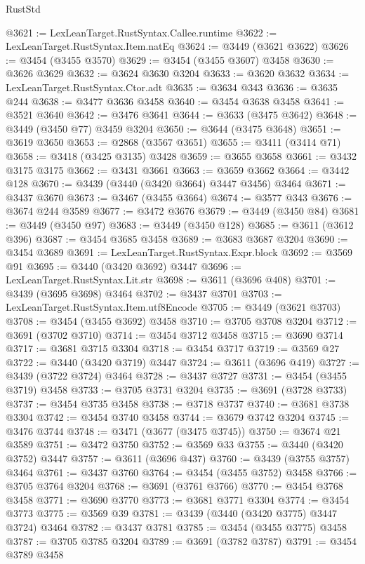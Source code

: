 \begin{lexlean}{RustStd}
\begin{coremodule}
{{{{{{{{{{{{{{{{{{{@3621 := LexLeanTarget.RustSyntax.Callee.runtime
@3622 := LexLeanTarget.RustSyntax.Item.natEq
@3624 := @3449 (@3621 @3622)
@3626 := @3454 (@3455 @3570)
@3629 := @3454 (@3455 @3607) @3458
@3630 := @3626 @3629
@3632 := @3624 @3630 @3204
@3633 := @3620 @3632
@3634 := LexLeanTarget.RustSyntax.Ctor.adt
@3635 := @3634 @343
@3636 := @3635 @244
@3638 := @3477 @3636 @3458
@3640 := @3454 @3638 @3458
@3641 := @3521 @3640
@3642 := @3476 @3641
@3644 := @3633 (@3475 @3642)
@3648 := @3449 (@3450 @77) @3459 @3204
@3650 := @3644 (@3475 @3648)
@3651 := @3619 @3650
@3653 := @2868 (@3567 @3651)
@3655 := @3411 (@3414 @71)
@3658 := @3418 (@3425 @3135) @3428
@3659 := @3655 @3658
@3661 := @3432 @3175 @3175
@3662 := @3431 @3661
@3663 := @3659 @3662
@3664 := @3442 @128
@3670 := @3439 (@3440 (@3420 @3664) @3447 @3456) @3464
@3671 := @3437 @3670
@3673 := @3467 (@3455 @3664)
@3674 := @3577 @343
@3676 := @3674 @244 @3589
@3677 := @3472 @3676
@3679 := @3449 (@3450 @84)
@3681 := @3449 (@3450 @97)
@3683 := @3449 (@3450 @128)
@3685 := @3611 (@3612 @396)
@3687 := @3454 @3685 @3458
@3689 := @3683 @3687 @3204
@3690 := @3454 @3689
@3691 := LexLeanTarget.RustSyntax.Expr.block
@3692 := @3569 @91
@3695 := @3440 (@3420 @3692) @3447
@3696 := LexLeanTarget.RustSyntax.Lit.str
@3698 := @3611 (@3696 @408)
@3701 := @3439 (@3695 @3698) @3464
@3702 := @3437 @3701
@3703 := LexLeanTarget.RustSyntax.Item.utf8Encode
@3705 := @3449 (@3621 @3703)
@3708 := @3454 (@3455 @3692) @3458
@3710 := @3705 @3708 @3204
@3712 := @3691 (@3702 @3710)
@3714 := @3454 @3712 @3458
@3715 := @3690 @3714
@3717 := @3681 @3715 @3304
@3718 := @3454 @3717
@3719 := @3569 @27
@3722 := @3440 (@3420 @3719) @3447
@3724 := @3611 (@3696 @419)
@3727 := @3439 (@3722 @3724) @3464
@3728 := @3437 @3727
@3731 := @3454 (@3455 @3719) @3458
@3733 := @3705 @3731 @3204
@3735 := @3691 (@3728 @3733)
@3737 := @3454 @3735 @3458
@3738 := @3718 @3737
@3740 := @3681 @3738 @3304
@3742 := @3454 @3740 @3458
@3744 := @3679 @3742 @3204
@3745 := @3476 @3744
@3748 := @3471 (@3677 (@3475 @3745))
@3750 := @3674 @21 @3589
@3751 := @3472 @3750
@3752 := @3569 @33
@3755 := @3440 (@3420 @3752) @3447
@3757 := @3611 (@3696 @437)
@3760 := @3439 (@3755 @3757) @3464
@3761 := @3437 @3760
@3764 := @3454 (@3455 @3752) @3458
@3766 := @3705 @3764 @3204
@3768 := @3691 (@3761 @3766)
@3770 := @3454 @3768 @3458
@3771 := @3690 @3770
@3773 := @3681 @3771 @3304
@3774 := @3454 @3773
@3775 := @3569 @39
@3781 := @3439 (@3440 (@3420 @3775) @3447 @3724) @3464
@3782 := @3437 @3781
@3785 := @3454 (@3455 @3775) @3458
@3787 := @3705 @3785 @3204
@3789 := @3691 (@3782 @3787)
@3791 := @3454 @3789 @3458
}}}}}}}}}}}}}}}}}}}
\end{coremodule}
\end{lexlean}
